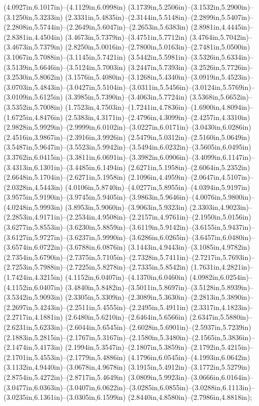 (4.0927in,6.1017in)--(4.1129in,6.0998in) (3.1739in,5.2506in)--(3.1532in,5.2900in)--(3.1250in,5.3233in) (2.3331in,5.4835in)--(2.3144in,5.5148in)--(2.2899in,5.5407in)--(2.2808in,5.5744in)--(2.2649in,5.6047in)--(2.2653in,5.6383in) (2.8981in,4.4445in)--(2.8381in,4.4504in) (3.4673in,5.7379in)--(3.4751in,5.7712in) (3.4764in,5.7042in)--(3.4673in,5.7379in) (2.8250in,5.0016in)--(2.7800in,5.0163in)--(2.7481in,5.0500in) (3.1067in,5.7088in)--(3.1145in,5.7421in) (3.5442in,5.5981in)--(3.5326in,5.6334in)--(3.5139in,5.6646in)--(3.5124in,5.7003in) (3.2447in,5.7393in)--(3.2526in,5.7726in)--(3.2530in,5.8062in) (3.1576in,5.4080in)--(3.1268in,5.4340in)--(3.0919in,5.4523in)--(3.0703in,5.4843in)--(3.0427in,5.5104in)--(3.0311in,5.5456in)--(3.0124in,5.5769in)--(3.0109in,5.6125in) (3.3985in,5.7390in)--(3.4063in,5.7724in) (3.5368in,5.6652in)--(3.5352in,5.7008in) (1.7523in,4.7503in)--(1.7241in,4.7836in)--(1.6900in,4.8094in)--(1.6725in,4.8476in) (2.5383in,4.3171in)--(2.4796in,4.3099in)--(2.4257in,4.3310in) (2.9828in,5.9929in)--(2.9999in,6.0102in)--(3.0227in,6.0171in)--(3.0430in,6.0286in) (2.4516in,3.9867in)--(2.3916in,3.9926in) (2.5479in,5.0312in)--(2.5160in,5.0649in) (3.5487in,5.9647in)--(3.5523in,5.9942in)--(3.5494in,6.0232in)--(3.5605in,6.0495in) (3.3762in,6.0415in)--(3.3811in,6.0691in)--(3.3982in,6.0906in)--(3.4099in,6.1147in)--(3.4313in,6.1301in)--(3.4485in,6.1494in) (2.6271in,5.1958in)--(2.6064in,5.2352in)
(2.6648in,5.1704in)--(2.6271in,5.1958in) (2.1096in,4.4959in)--(2.0647in,4.5107in)--(2.0328in,4.5443in) (4.0106in,5.8740in)--(4.0277in,5.8955in)--(4.0394in,5.9197in) (3.9575in,5.9190in)--(3.9745in,5.9405in)--(3.9863in,5.9646in)--(4.0076in,5.9800in)--(4.0248in,5.9993in) (3.8953in,5.9060in)--(3.9063in,5.9323in) (2.3303in,4.9023in)--(2.2853in,4.9171in)--(2.2534in,4.9508in)--(2.2157in,4.9761in)--(2.1950in,5.0156in) (3.6277in,5.8553in)--(3.6230in,5.8859in)--(3.6119in,5.9142in)--(3.6155in,5.9437in)--(3.6127in,5.9727in)--(3.6237in,5.9990in)--(3.6286in,6.0265in)--(3.6457in,6.0480in)--(3.6574in,6.0722in)--(3.6788in,6.0876in) (3.1443in,4.9443in)--(3.1085in,4.9782in) (2.7354in,5.6790in)--(2.7375in,5.7105in)--(2.7328in,5.7411in)--(2.7217in,5.7693in)--(2.7253in,5.7988in)--(2.7225in,5.8278in)--(2.7335in,5.8542in) (1.7631in,4.2821in)--(1.7424in,4.3215in) (4.1152in,6.0407in)--(4.1370in,6.0460in) (4.0982in,6.0254in)--(4.1152in,6.0407in) (3.4840in,5.8482in)--(3.5011in,5.8697in)--(3.5128in,5.8939in)--(3.5342in,5.9093in) (2.3305in,5.3309in)--(2.3089in,5.3630in)--(2.2813in,5.3890in)--(2.2697in,5.4243in)--(2.2511in,5.4555in)--(2.2495in,5.4911in) (2.3317in,4.1823in)--(2.2717in,4.1881in) (2.6480in,5.6210in)--(2.6464in,5.6566in) (2.6347in,5.5880in)--(2.6231in,5.6233in)--(2.6044in,5.6545in)--(2.6028in,5.6901in)--(2.5937in,5.7239in) (2.1883in,5.2815in)--(2.1767in,5.3167in)--(2.1580in,5.3480in)--(2.1565in,5.3836in)--(2.1474in,5.4173in) (2.1994in,5.3547in)--(2.1807in,5.3859in)--(2.1792in,5.4215in)--(2.1701in,5.4553in)--(2.1779in,5.4886in) (4.1796in,6.0545in)--(4.1993in,6.0642in) (3.1132in,4.9440in)--(3.0678in,4.9678in) (3.1915in,5.4912in)--(3.1772in,5.5279in) (2.8754in,5.4272in)--(2.8717in,5.4649in) (3.0809in,5.9923in)--(3.0666in,6.0164in)--(3.0477in,6.0363in)--(3.0407in,6.0622in)--(3.0285in,6.0855in)--(3.0288in,6.1113in)--(3.0235in,6.1361in)--(3.0305in,6.1599in) (2.8440in,4.8580in)--(2.7986in,4.8818in);
